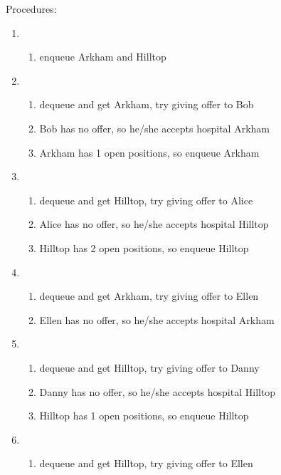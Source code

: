 \documentclass[14pt, a4paper]{article}
\begin{document}
\begin{enumerate}
    Procedures:
    \begin{enumerate}
        \item
            \begin{enumerate}
                \item enqueue Arkham and Hilltop
            \end{enumerate}
        \item
            \begin{enumerate}
                \item dequeue and get Arkham, try giving offer to Bob
                \item Bob has no offer, so he/she accepts hospital Arkham
                \item Arkham has 1 open positions, so enqueue Arkham
            \end{enumerate}
        \item
            \begin{enumerate}
                \item dequeue and get Hilltop, try giving offer to Alice
                \item Alice has no offer, so he/she accepts hospital Hilltop
                \item Hilltop has 2 open positions, so enqueue Hilltop
            \end{enumerate}
        \item
            \begin{enumerate}
                \item dequeue and get Arkham, try giving offer to Ellen
                \item Ellen has no offer, so he/she accepts hospital Arkham
            \end{enumerate}
        \item
            \begin{enumerate}
                \item dequeue and get Hilltop, try giving offer to Danny
                \item Danny has no offer, so he/she accepts hospital Hilltop
                \item Hilltop has 1 open positions, so enqueue Hilltop
            \end{enumerate}
        \item
            \begin{enumerate}
                \item dequeue and get Hilltop, try giving offer to Ellen

\end{enumerate}
\end{enumerate}
\end{enumerate}
\end{document}
